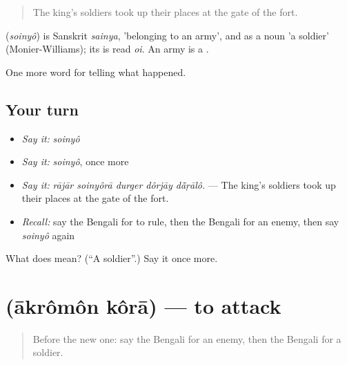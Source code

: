 \begin{quote}
The king's soldiers took up their places at the gate of the fort.
\end{quote}

\begin{cousinweb}
\textbf{} (\emph{soinyô}) is Sanskrit \emph{sainya}, 'belonging to an army', and as a noun 'a soldier' (Monier-Williams); its  is read \emph{oi}. An army is a \textbf{}.
\end{cousinweb}

\begin{grammarlens}[title={What you've built}]
One more word for telling what happened.
\end{grammarlens}

\subsection*{Your turn}
\begin{itemize}
\raggedright
  \item \emph{Say it:} \emph{soinyô}
  \item \emph{Say it:} \emph{soinyô}, once more
  \item \emph{Say it:} \emph{rājār soinyôrā durger dôrjāy dā̃ṛālô.} — The king's soldiers took up their places at the gate of the fort.
  \item \emph{Recall:} say the Bengali for to rule, then the Bengali for an enemy, then say \emph{soinyô} again
\end{itemize}

\begin{tcolorbox}[breakable,colback=teal!4,colframe=teal!35!black,title={Before you move on}]
What does  mean? (\textquotedblleft{}A soldier\textquotedblright{}.) Say it once more.
\end{tcolorbox}
\section[\texorpdfstring{\bn{আক্রমণ} \bn{করা} (ākrômôn kôrā)}{আক্রমণ করা (ākrômôn kôrā)}]{  (ākrômôn kôrā) — to attack}

\label{lesson:BN-C314-akromon-kora}



\begin{quote}
Before the new one: say the Bengali for an enemy, then the Bengali for a soldier.
\end{quote}

